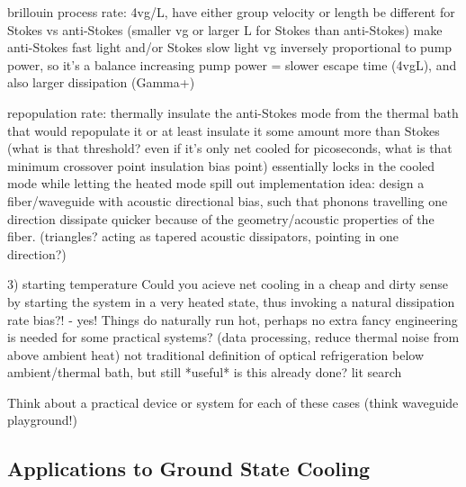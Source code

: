        brillouin process rate:
         4vg/L, have either group velocity or length be different for Stokes vs anti-Stokes (smaller vg or larger L for Stokes than anti-Stokes)
         make anti-Stokes fast light and/or Stokes slow light
         vg inversely proportional to pump power, so it's a balance
           increasing pump power = slower escape time (4vgL), and also larger dissipation (Gamma+)

       repopulation rate:
         thermally insulate the anti-Stokes mode from the thermal bath that would repopulate it
         or at least insulate it some amount more than Stokes (what is that threshold? even if it's only net cooled for picoseconds, what is that minimum crossover point insulation bias point)
         essentially locks in the cooled mode while letting the heated mode spill out
         implementation idea:
           design a fiber/waveguide with acoustic directional bias, such that phonons travelling one direction dissipate quicker because of the geometry/acoustic properties of the fiber. (triangles? acting as tapered acoustic dissipators, pointing in one direction?)

3) starting temperature
     Could you acieve net cooling in a cheap and dirty sense by starting the system in a very heated state, thus invoking a natural dissipation rate bias?! - yes!
     Things do naturally run hot, perhaps no extra fancy engineering is needed for some practical systems? (data processing, reduce thermal noise from above ambient heat)
     not traditional definition of optical refrigeration below ambient/thermal bath, but still *useful*
     is this already done? lit search

Think about a practical device or system for each of these cases (think waveguide playground!)

\subsection{Applications to Ground State Cooling}
\label{Cooling:subsec:ApplicationstoGroundStateCooling}
